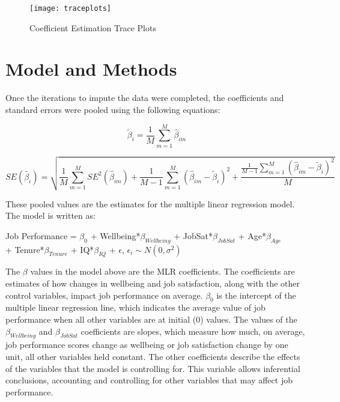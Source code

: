 \documentclass{svproc}
\begin{document}
\begin{figure}
\begin{center}
\caption{Coefficient Estimation Trace Plots}
\texttt{[image: traceplots]}
\label{traceplots}
\smallskip
\end{center}
\end{figure}

\section{Model and Methods}

Once the iterations to impute the data were completed, the coefficients and standard errors were pooled using the following equations:

\begin{equation}
\tilde{\beta}_i = \frac{1}{M}\sum_{m=1}^{M} \hat{\beta}_{im}
\end{equation}

\bigskip

\begin{equation}
SE(\tilde{\beta_i}) = \sqrt{\frac{1}{M}\sum_{m=1}^{M} SE^2(\hat{\beta}_{im}) + \frac{1}{M-1}\sum_{m=1}^{M} (\hat{\beta}_{im} - \tilde{\beta}_i)^2 + \frac{\frac{1}{M-1}\sum_{m=1}^{M} (\hat{\beta}_{im} - \tilde{\beta}_i)^2}{M} }
\end{equation}

\begin{center}
{ }
\end{center}

These pooled values are the estimates for the multiple linear regression model. The model is written as:

\begin{center}
{ }
\end{center}

\begin{center}
Job Performance = $\beta_0$ + Wellbeing*$\beta_{Wellbeing}$ + JobSat*$\beta_{JobSat}$ + Age*$\beta_{Age}$ \\ + Tenure*$\beta_{Tenure}$ + IQ*$\beta_{IQ}$ + $\epsilon$, ${ \epsilon_i} \sim N(0,\sigma^2)$
\end{center}

\begin{center}
{ }
\end{center}

The $\beta$ values in the model above are the MLR coefficients. The coefficients are estimates of how changes in wellbeing and job satisfaction, along with the other control variables, impact job performance on average. $\beta_0$ is the intercept of the multiple linear regression line, which indicates the average value of job performance when all other variables are at initial (0) values. The values of the $\beta_{Wellbeing}$ and $\beta_{JobSat}$ coefficients are slopes, which measure how much, on average, job performance scores change as wellbeing or job satisfaction change by one unit, all other variables held constant. The other coefficients describe the effects of the variables that the model is controlling for. This variable allows inferential conclusions, accounting and controlling for other variables that may affect job performance.
\end{document}

